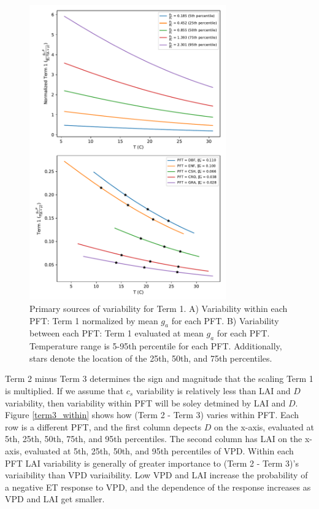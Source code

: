 \documentclass[draft,linenumbers]{agujournal}
\begin{document}
\begin{figure}[h]
\centering
\includegraphics[width=20pc]{./fig04.pdf}
\caption{Primary sources of variability for Term 1. A) Variability within each PFT: Term 1 normalized by mean $g_a$ for each PFT. B) Variability between each PFT: Term 1 evaluated at mean $g_a$ for each PFT. Temperature range is 5-95th percentile for each PFT. Additionally, stars denote the location of the 25th, 50th, and 75th percentiles.}
\label{scale_vary}
\end{figure}

Term 2 minus Term 3 determines the sign and magnitude that the scaling Term 1 is multiplied. If we assume that $c_s$ variability is relatively less than LAI and $D$ variability, then variability within PFT will be soley detmined by LAI and $D$. Figure \ref{term3_within} shows how (Term 2 - Term 3) varies within PFT. Each row is a different PFT, and the first column depects $D$ on the x-axis, evaluated at 5th, 25th, 50th, 75th, and 95th percentiles. The second column has LAI on the x-axis, evaluated at 5th, 25th, 50th, and 95th percentiles of VPD. Within each PFT LAI variability is generally of greater importance to (Term 2 - Term 3)'s variaibility than VPD variaibility. Low VPD and LAI increase the probability of a negative ET response to VPD, and the dependence of the response increases as VPD and LAI get smaller.
\end{document}
